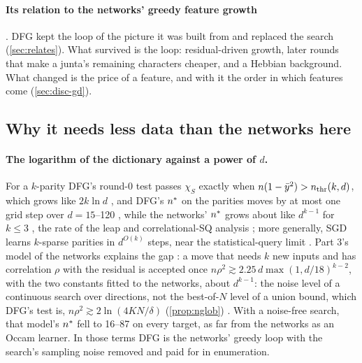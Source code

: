 \paragraph{Its relation to the networks' greedy feature growth} . DFG kept the loop of the picture it was built from and replaced the search (\cref{sec:relates}). What survived is the loop: residual-driven growth, later rounds that make a junta's remaining characters cheaper, and a Hebbian background. What changed is the price of a feature, and with it the order in which features come (\cref{sec:disc-gd}).

\subsection{Why it needs less data than the networks here}\label{sec:disc-why}

\paragraph{The logarithm of the dictionary against a power of $d$.} For a $k$-parity DFG's round-0 test passes $\chi_S$ exactly when $n(1-\bar y^2)>n_{\rm thr}(k,d)$, which grows like $2k\ln d$ , and DFG's $n^{*}$ on the parities moves by at most one grid step over $d=15$--120 , while the networks' $n^{*}$ grows about like $d^{k-1}$ for $k\le3$ , the rate of the leap and correlational-SQ analysis \cite{abbe2023leap}; more generally, SGD learns $k$-sparse parities in $d^{O(k)}$ steps, near the statistical-query limit \cite{barak2022hidden}. Part 3's model of the networks explains the gap \cite{gdcircuit2026}: a move that needs $k$ new inputs and has correlation $\rho$ with the residual is accepted once $n\rho^2\gtrsim2.25\,d\max(1,d/18)^{k-2}$, with the two constants fitted to the networks, about $d^{k-1}$: the noise level of a continuous search over directions, not the best-of-$N$ level of a union bound, which DFG's test is, $n\rho^2\gtrsim2\ln(4KN/\delta)$ (\cref{prop:nglob}) . With a noise-free search, that model's $n^{*}$ fell to 16--87 on every target, as far from the networks as an Occam learner. In those terms DFG is the networks' greedy loop with the search's sampling noise removed and paid for in enumeration.

